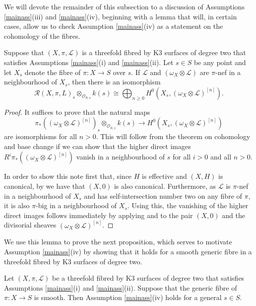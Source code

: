 \documentclass{amsart}
\begin{document}
We will devote the remainder of this subsection to a discussion of Assumptions \ref{mainass}(iii) and \ref{mainass}(iv), beginning with a lemma that will, in certain cases, allow us to check Assumption \ref{mainass}(iv) as a statement on the cohomology of the fibres.

\begin{lemma} \label{locallemma} Suppose that $(X,\pi,{\mathcal{L}})$ is a threefold fibred by K3 surfaces of degree two that satisfies Assumptions \ref{mainass}\textup{(}i\textup{)} and \ref{mainass}\textup{(}ii\textup{)}. Let $s \in S$ be any point and let $X_s$ denote the fibre of $\pi\colon X \to S$ over $s$. If ${\mathcal{L}}$ and $(\omega_X\otimes{\mathcal{L}})$ are $\pi$-nef in a neighbourhood of $X_s$, then there is an isomorphism
\[ {\mathcal{R}}(X,\pi,L)_s \otimes_{{\mathcal{O}}_{S,s}} k(s) \cong \bigoplus_{n \geq 0} H^0(X_s, (\omega_X \otimes {\mathcal{L}})^{[n]}).\]
\end{lemma}
\begin{proof} It suffices to prove that the natural maps 
\[\pi_*((\omega_X \otimes {\mathcal{L}})^{[n]})_s \otimes_{{\mathcal{O}}_{S,s}} k(s) \longrightarrow H^0(X_s, (\omega_X \otimes {\mathcal{L}})^{[n]})\] 
are isomorphisms for all $n > 0$. This will follow from the theorem on cohomology and base change if we can show that the higher direct images $R^i\pi_*\left((\omega_X \otimes {\mathcal{L}})^{[n]}\right)$ vanish in a neighbourhood of $s$ for all $i > 0$ and all $n > 0$. 

In order to show this note first that, since $H$ is effective and $(X,H)$ is canonical, by \cite[Corollary 2.35]{bgav} we have that $(X,0)$ is also canonical. Furthermore, as ${\mathcal{L}}$ is $\pi$-nef in a neighbourhood of $X_s$ and has self-intersection number two on any fibre of $\pi$, it is also $\pi$-big in a neighbourhood of $X_s$. Using this, the vanishing of the higher direct images follows immediately by applying \cite[Theorem 1.2.5]{immp} and \cite[Remark 1.2.6]{immp} to the pair $(X,0)$ and the divisorial sheaves $(\omega_X \otimes {\mathcal{L}})^{[n]}$.
\end{proof}

We use this lemma to prove the next proposition, which serves to motivate Assumption \ref{mainass}(iv) by showing that it holds for a smooth generic fibre in a threefold fibred by K3 surfaces of degree two.

\begin{prop} \label{smoothprop} Let $(X,\pi,{\mathcal{L}})$ be a threefold fibred by K3 surfaces of degree two that satisfies Assumptions \ref{mainass}\textup{(}i\textup{)} and \ref{mainass}\textup{(}ii\textup{)}. Suppose that the generic fibre of $\pi\colon X \to S$ is smooth. Then Assumption \ref{mainass}\textup{(}iv\textup{)} holds for a general $s \in S$.\end{prop}
 
\end{document}
